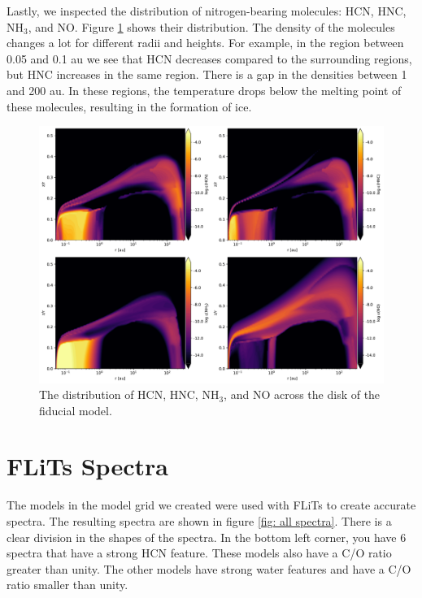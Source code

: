 \documentclass[twoside, single, authoryear, semicolon]{lion-msc}
\newcommand{\4}{$_4$}
\newcommand{\3}{$_3$}
\newcommand{\2}{$_2$}
\begin{document}
Lastly, we inspected the distribution of nitrogen-bearing molecules: HCN, HNC, NH\3, and NO. Figure \ref{fig: nitrogen distribution} shows their distribution. The density of the molecules changes a lot for different radii and heights. For example, in the region between 0.05 and 0.1 au we see that HCN decreases compared to the surrounding regions, but HNC increases in the same region. There is a gap in the densities between 1 and 200 au. In these regions, the temperature drops below the melting point of these molecules, resulting in the formation of ice. 

\begin{figure}[!ht]
    \centering
    \includegraphics[width=.8\linewidth]{Figures/Abundance.pdf}
    \caption{The distribution of HCN, HNC, NH\3, and NO across the disk of the fiducial model.}
    \label{fig: nitrogen distribution}
\end{figure}

\section{FLiTs Spectra}
The models in the model grid we created were used with FLiTs to create accurate spectra. The resulting spectra are shown in figure \ref{fig: all spectra}. There is a clear division in the shapes of the spectra. In the bottom left corner, you have 6 spectra that have a strong HCN feature. These models also have a C/O ratio greater than unity. The other models have strong water features and have a C/O ratio smaller than unity. 
\end{document}
